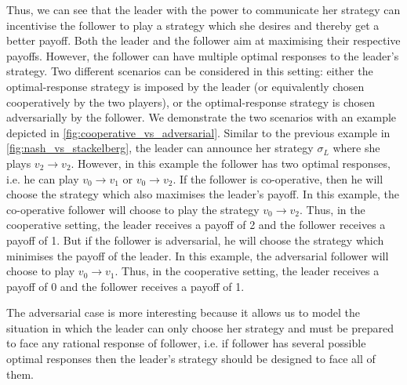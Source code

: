 Thus, we can see that the leader with the power to communicate her strategy can incentivise the follower to play a strategy which she desires and thereby get a better payoff. Both the leader and the follower aim at maximising their respective payoffs. However, the follower can have multiple optimal responses to the leader's strategy. Two different scenarios can be considered in this setting: either the optimal-response strategy is imposed by the leader (or equivalently chosen cooperatively by the two players), or the optimal-response strategy is chosen adversarially by the follower. We demonstrate the two scenarios with an example depicted in \cref{fig:cooperative_vs_adversarial}. Similar to the previous example in \cref{fig:nash_vs_stackelberg}, the leader can announce her strategy $\sigma_L$ where she plays $v_2 \to v_2$. However, in this example the follower has two optimal responses, i.e. he can play $v_0 \to v_1$ or $v_0 \to v_2$. If the follower is co-operative, then he will choose the strategy which also maximises the leader's payoff. In this example, the co-operative follower will choose to play the strategy $v_0 \to v_2$. Thus, in the cooperative setting, the leader receives a payoff of 2 and the follower receives a payoff of 1. But if the follower is adversarial, he will choose the strategy which minimises the payoff of the leader. In this example, the adversarial follower will choose to play $v_0 \to v_1$. Thus, in the cooperative setting, the leader receives a payoff of 0 and the follower receives a payoff of 1.

The adversarial case is more interesting because it allows us to model the situation in which the leader can only choose her strategy and must be prepared to face any rational response of follower, i.e. if follower has several possible optimal responses then the leader's strategy should be designed to face all of them.

